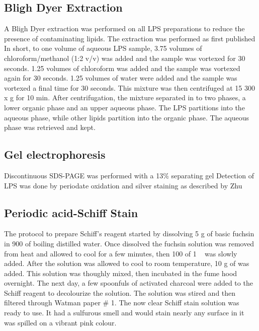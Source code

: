 	\subsection{Bligh Dyer Extraction} %
	\label{sub:bligh_dyer_extraction}
		A Bligh Dyer extraction was performed on all \ac{LPS} preparations to reduce the presence of contaminating lipids. The extraction was performed as first published In short,  to one volume of aqueous \ac{LPS} sample, 3.75 volumes of chloroform/methanol (1:2 v/v) was added and the sample was vortexed for 30 seconds. 1.25 volumes of chloroform was added and the sample was vortexed again for 30 seconds. 1.25 volumes of water were added and the sample was vortexed a final time for 30 seconds. This mixture was then centrifuged at 15 300 x g for 10 min. After centrifugation, the mixture separated in to two phases, a lower organic phase and an upper aqueous phase. The \ac{LPS} partitions into the aqueous phase, while other lipids partition into the organic phase. The aqueous phase was retrieved and kept.

	\subsection{Gel electrophoresis} %
	\label{sub:gel_electrophoresis}

		Discontinuous \ac{SDS-PAGE} was performed with a 13\% separating gel Detection of \ac{LPS} was done by periodate oxidation and silver staining as described by Zhu \etal\!

	\subsection{Periodic acid-Schiff Stain} %
	\label{sub:schiff_stain}
	
		The protocol to prepare Schiff's reagent started by dissolving 5 \si{\gram} of basic fuchsin in 900 \millilitre of boiling distilled water. Once dissolved the fuchsin solution was removed from heat and allowed to cool for a few minutes, then 100 \millilitre of 1 \molar\  was slowly added. After the solution was allowed to cool to room temperature, 10 \si{\gram} of  was added. This solution was thoughly mixed, then incubated in the fume hood overnight. The next day, a few spoonfuls of activated charcoal were added to the Schiff reagent to decolourize the solution. The solution was stired and then filtered through Watman paper \# 1. The now clear Schiff stain solution was ready to use. It had a sulfurous smell and would stain nearly any surface in it was spilled on a vibrant pink colour.

